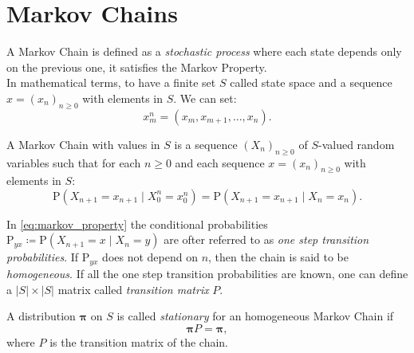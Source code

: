\documentclass[\rootdir/main.tex]{subfiles}
\begin{document}
\section{Markov Chains}
A Markov Chain is defined as a \emph{stochastic process} where each state depends only on the previous one, \ie it satisfies the Markov Property.\\ 
In mathematical terms,  to have a finite set $S$ called state space and a sequence $x = \left(x_n \right)_{n \geq 0}$ with elements in $S$. We can set:
\begin{equation*}
    x_m^n = \left(x_m, x_{m+1}, \dots, x_n \right).
\end{equation*}
\begin{definition}\label{def:markov_property}
    A Markov Chain with values in $S$ is a sequence $\left(X_n \right)_{n \geq 0}$ of $S$-valued random variables such that for each $n \geq 0$ and each sequence $x = \left(x_n \right)_{n \geq 0}$ with elements in $S$:
    \begin{equation}\label{eq:markov_property}
         \mathrm{P}\left(X_{n+1}=x_{n+1} \mid X_0^n=x_0^n\right)=\mathrm{P}\left(X_{n+1}=x_{n+1} \mid X_n=x_n\right).
\end{equation}
\end{definition}
In \cref{eq:markov_property} the conditional probabilities $\mathrm{P}_{yx} \coloneq \mathrm{P}\left(X_{n+1}=x \mid X_n=y\right)$ are ofter referred to as \emph{one step transition probabilities}. If $\mathrm{P}_{yx}$ does not depend on $n$, then the chain is said to be \emph{homogeneous}. If all the one step transition probabilities are known, one can define a $|S| \times |S|$ matrix called \emph{transition matrix} $P$.
\begin{definition}
    A distribution $\symbf{\pi}$ on $S$ is called \emph{stationary} for an homogeneous Markov Chain if
    \begin{equation*}
        \symbf{\pi} P = \symbf{\pi},
    \end{equation*}
    where $P$ is the transition matrix of the chain.
\end{definition}
\end{document}
